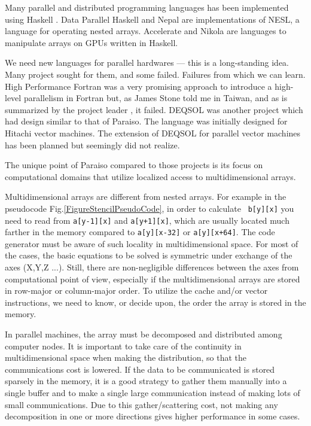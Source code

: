 \documentclass[twocolumn]{article}
\begin{document}
Many parallel and distributed programming languages has been implemented using
Haskell \cite{CambridgeJournals:114967}. Data Parallel Haskell
\cite{nested-data-parallelism} and
Nepal\cite{springerlink:10.10073-540-44681-8_76} are implementations of NESL,
a language for operating nested arrays.
Accelerate \cite{Chakravarty:2011:AHA:1926354.1926358} and
Nikola \cite{Mainland:2010:NEC:1863523.1863533} are languages to manipulate arrays on GPUs written in Haskell.

We need new languages for parallel hardwares --- this is a long-standing
idea. Many project sought for them, and some failed. Failures from which we
can learn. High Performance Fortran was a very promising approach to introduce
a high-level parallelism in Fortran but, as James Stone told me in Taiwan, and
as is summarized by the project leader
\cite{Kennedy:2007:RFH:1238844.1238851}, it failed.  DEQSOL
\cite{SAGAWANOBUTOSHI:1989-01-15,Kon'no:1986:AIS:324493.325029} was another
project which had design similar to that of Paraiso. The language was
initially designed for Hitachi vector machines. The extension of DEQSOL for
parallel vector machines has been planned \cite{SagawaNobutoshi:1989-03-15}
but seemingly did not realize.

The unique point of Paraiso compared to those projects is its focus on
computational domains that utilize localized access to multidimensional
arrays.

Multidimensional arrays are different from nested arrays. For example in the
pseudocode Fig.\ref{FigureStencilPseudoCode}, in order to calculate {\tt
  b[y][x]} you need to read from {\tt a[y-1][x]} and {\tt a[y+1][x]}, which
are usually located much farther in the memory compared to {\tt a[y][x-32]} or
{\tt a[y][x+64]}. The code generator must be aware of such locality in
multidimensional space.  For most of the cases, the basic equations to be
solved is symmetric under exchange of the axes (X,Y,Z ...). Still, there are
non-negligible differences between the axes from computational point of view,
especially if the multidimensional arrays are stored in row-major or
column-major order. To utilize the cache and/or vector instructions, we need
to know, or decide upon, the order the array is stored in the memory.

In parallel machines, the array must be decomposed and distributed among
computer nodes. It is important to take care of the continuity in
multidimensional space when making the distribution, so that the
communications cost is lowered. If the data to be communicated is stored
sparsely in the memory, it is a good strategy to gather them manually into a
single buffer and to make a single large communication instead of making lots
of small communications. Due to this gather/scattering cost, not making any
decomposition in one or more directions gives higher performance in some
cases.
\end{document}
